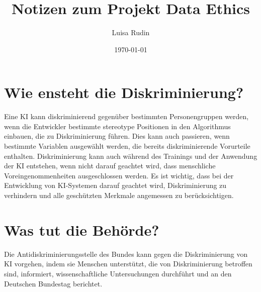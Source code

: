 \documentclass{article}
\title{Notizen zum Projekt Data Ethics}
\author{Luisa Rudin}
\date{\today}
\begin{document}
\maketitle


\tableofcontents

\section{Wie ensteht die Diskriminierung?}
Eine KI kann diskriminierend gegenüber bestimmten Personengruppen werden, wenn die Entwickler bestimmte stereotype Positionen in den Algorithmus einbauen, die zu Diskriminierung führen. Dies kann auch passieren, wenn bestimmte Variablen ausgewählt werden, die bereits diskriminierende Vorurteile enthalten. Diskriminierung kann auch während des Trainings und der Anwendung der KI entstehen, wenn nicht darauf geachtet wird, dass menschliche Voreingenommenheiten ausgeschlossen werden. Es ist wichtig, dass bei der Entwicklung von KI-Systemen darauf geachtet wird, Diskriminierung zu verhindern und alle geschützten Merkmale angemessen zu berücksichtigen.


\section{Was tut die Behörde?}
Die Antidiskriminierungsstelle des Bundes kann gegen die Diskriminierung von KI vorgehen, indem sie Menschen unterstützt, die von Diskriminierung betroffen sind, informiert, wissenschaftliche Untersuchungen durchführt und an den Deutschen Bundestag berichtet.


\printbibliography
\end{document}
